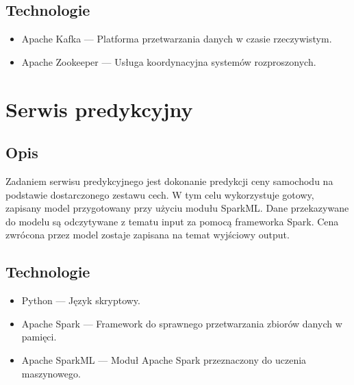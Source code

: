 \documentclass[12pt, a4paper]{report}
\begin{document}
\section{Technologie}
\begin{itemize}
    \item Apache Kafka --- Platforma przetwarzania danych w czasie rzeczywistym.
    \item Apache Zookeeper --- Usługa koordynacyjna systemów rozproszonych.
\end{itemize}


\chapter{Serwis predykcyjny}
\section{Opis}
    Zadaniem serwisu predykcyjnego jest dokonanie predykcji ceny samochodu na podstawie dostarczonego zestawu cech.
    W tym celu wykorzystuje gotowy, zapisany model przygotowany przy użyciu modułu SparkML.\@
    Dane przekazywane do modelu są odczytywane z tematu input za pomocą frameworka Spark. Cena zwrócona przez
    model zostaje zapisana na temat wyjściowy output.
\section{Technologie}
\begin{itemize}
    \item Python --- Język skryptowy. 
    \item Apache Spark --- Framework do sprawnego przetwarzania zbiorów danych w pamięci.
    \item Apache SparkML --- Moduł Apache Spark przeznaczony do uczenia maszynowego.
\end{itemize}
\end{document}
